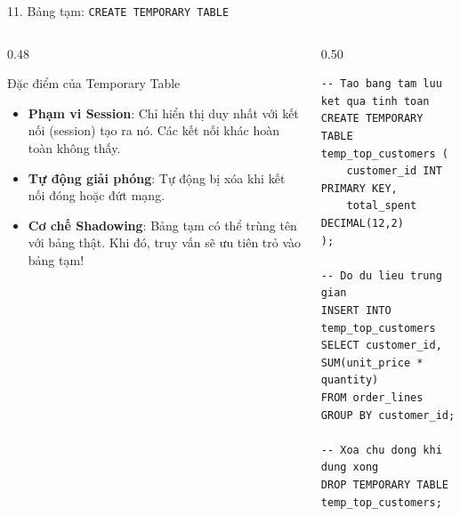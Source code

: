 \documentclass[aspectratio=169,11pt]{beamer}
\newcommand{\kw}[1]{\textcolor{dbblue}{\textbf{#1}}}
\begin{document}
\begin{frame}[fragile]{11. Bảng tạm: \texttt{CREATE TEMPORARY TABLE}}
\begin{columns}[t]
  \begin{column}{0.48\textwidth}
    \begin{block}{Đặc điểm của Temporary Table}
      \begin{itemize}\setlength{\itemsep}{1.5pt}
        \item \kw{Phạm vi Session}: Chỉ hiển thị duy nhất với kết nối (session) tạo ra nó. Các kết nối khác hoàn toàn không thấy.
        \item \kw{Tự động giải phóng}: Tự động bị xóa khi kết nối đóng hoặc đứt mạng.
        \item \textbf{Cơ chế Shadowing}: Bảng tạm có thể trùng tên với bảng thật. Khi đó, truy vấn sẽ ưu tiên trỏ vào bảng tạm!
      \end{itemize}
    \end{block}
  \end{column}
  \begin{column}{0.50\textwidth}
\begin{lstlisting}
-- Tao bang tam luu ket qua tinh toan
CREATE TEMPORARY TABLE temp_top_customers (
    customer_id INT PRIMARY KEY,
    total_spent DECIMAL(12,2)
);

-- Do du lieu trung gian
INSERT INTO temp_top_customers
SELECT customer_id, SUM(unit_price * quantity)
FROM order_lines
GROUP BY customer_id;

-- Xoa chu dong khi dung xong
DROP TEMPORARY TABLE temp_top_customers;
\end{lstlisting}
  \end{column}
\end{columns}
\end{frame}

\end{document}
